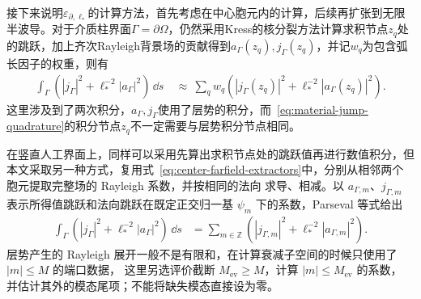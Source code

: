 接下来说明$\varepsilon_{\partial,\ell_*}$的计算方法，首先考虑在中心胞元内的计算，后续再扩张到无限半波导。对于介质柱界面$\Gamma = \partial \Omega$，仍然采用Kress的核分裂方法计算求积节点$z_q$处的跳跃，加上齐次Rayleigh背景场的贡献得到$a_\Gamma(z_q), j_\Gamma(z_q)$，并记$w_q$为包含弧长因子的权重，则有
\begin{align}
  \int_\Gamma\left(|j_\Gamma|^2+\ell_*^{-2}|a_\Gamma|^2\right)\,\dd s
  &\ \approx\
  \sum_q w_q\left(
    |j_\Gamma(z_q)|^2+\ell_*^{-2}|a_\Gamma(z_q)|^2
  \right).
  \label{eq:material-jump-quadrature}
\end{align}
这里涉及到了两次积分，$a_\Gamma, j_\Gamma$使用了层势的积分，而~\eqref{eq:material-jump-quadrature}的积分节点$z_q$不一定需要与层势积分节点相同。

在竖直人工界面上，同样可以采用先算出求积节点处的跳跃值再进行数值积分，但本文采取另一种方式，复用式~\eqref{eq:center-farfield-extractors}中，分别从相邻两个胞元提取完整场的 Rayleigh 系数，并按相同的法向
求导、相减。以 $a_{\Gamma,m}$、$j_{\Gamma,m}$ 表示所得值跳跃和法向跳跃在既定正交归一基
$\psi_m$ 下的系数，Parseval 等式给出
\begin{align}
  \int_\Gamma\left(|j_\Gamma|^2+\ell_*^{-2}|a_\Gamma|^2\right)\,\dd s
  &=
  \sum_{m\in\mathbb Z}
  \left(|j_{\Gamma,m}|^2+\ell_*^{-2}|a_{\Gamma,m}|^2\right).
  \label{eq:artificial-jump-parseval}
\end{align}
层势产生的 Rayleigh 展开一般不是有限和，在计算衰减子空间的时候只使用了 $|m|\leq M$ 的端口数据，
这里另选评价截断 $M_{\mathrm{ev}}\geq M$，计算 $|m|\leq M_{\mathrm{ev}}$ 的系数，
并估计其外的模态尾项；不能将缺失模态直接设为零。

